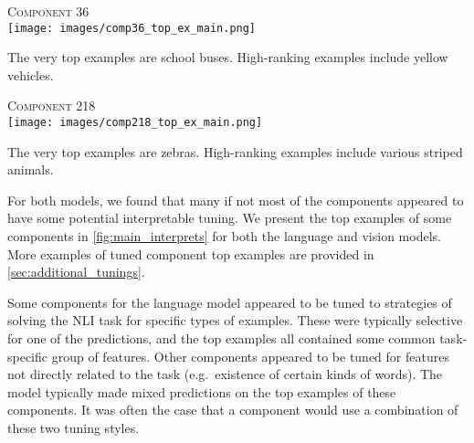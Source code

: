 \documentclass[dvipsnames]{article}
\begin{document}
\begin{figure*}[ht]
\begin{minipage}{.39\textwidth}
\textsc{Component 36}\\

\texttt{[image: images/comp36\_top\_ex\_main.png]} \vspace{-2mm} \\
\begin{flushleft}
\begin{small}
The very top examples are school buses.
High-ranking examples include yellow vehicles.
\end{small}
\end{flushleft}

\textsc{Component 218}\\

\texttt{[image: images/comp218\_top\_ex\_main.png]} \vspace{-2mm} \\
\begin{flushleft}
\begin{small}
The very top examples are zebras.
High-ranking examples include various striped animals.
\end{small}
\end{flushleft}

\end{minipage}
\caption{%
Top examples for some language and vision model components.
The examples presented for the language model components are the ones with the top 4 highest coefficients.
The top two rows for each vision model component are the examples with the 8 highest coefficients.
The bottom row for each vision model component contains selected examples from the set of top 32 examples.
}
\label{fig:main_interprets}
\vskip -0.2in
\end{figure*}

For both models, we found that many if not most of the components appeared to have some potential interpretable tuning.
We present the top examples of some components in \cref{fig:main_interprets} for both the language and vision models.
More examples of tuned component top examples are provided in \cref{sec:additional_tunings}.

Some components for the language model appeared to be tuned to strategies of solving the NLI task for specific types of examples. %
These were typically selective for one of the predictions, and the top examples all contained some common task-specific group of features.
Other components appeared to be tuned for features not directly related to the task (e.g.\ existence of certain kinds of words).
The model typically made mixed predictions on the top examples of these components.
It was often the case that a component would use a combination of these two tuning styles.
\end{document}
